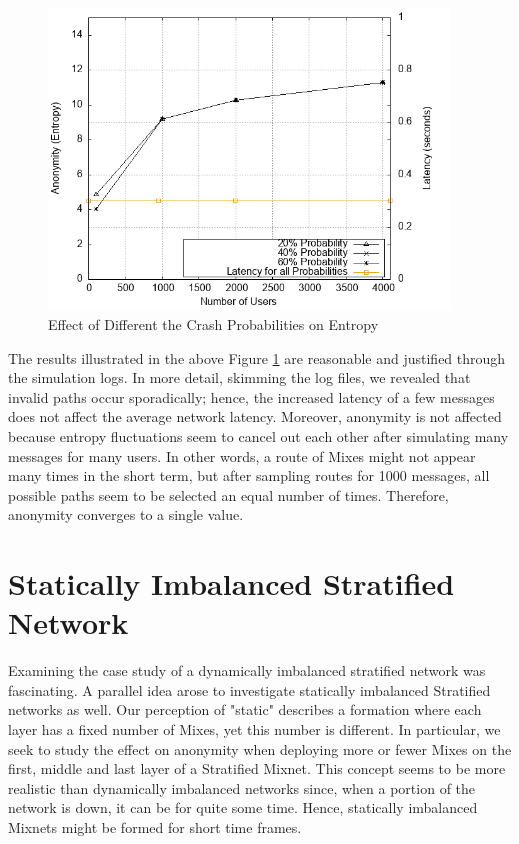 \documentclass[logo,msc,cyber]{infthesis}   %
\begin{document}
\begin{figure}[h!]
    \centering
    \includegraphics[height=8cm]{figures/simulator_extentions/mix_failure.png}
    \caption{Effect of Different the Crash Probabilities on Entropy}
    \label{fig:dynamic-crash-probability}
\end{figure}    


The results illustrated in the above Figure \ref{fig:dynamic-crash-probability}
are reasonable and justified through the simulation logs. In more detail,
skimming the log files, we revealed that invalid paths occur sporadically; hence,
the increased latency of a few messages does not affect the average network
latency. Moreover, anonymity is not affected because entropy fluctuations seem
to cancel out each other after simulating many messages for many users. In other
words, a route of Mixes might not appear many times in the short term, but after
sampling routes for 1000 messages, all possible paths seem to be selected an
equal number of times. Therefore, anonymity converges to a single value.

\section{Statically Imbalanced Stratified Network}

Examining the case study of a dynamically imbalanced stratified network was
fascinating. A parallel idea arose to investigate statically imbalanced
Stratified networks as well. Our perception of "static" describes a formation
where each layer has a fixed number of Mixes, yet this number is different. In
particular, we seek to study the effect on anonymity when deploying more or
fewer Mixes on the first, middle and last layer of a Stratified Mixnet. This
concept seems to be more realistic than dynamically imbalanced networks since,
when a portion of the network is down, it can be for quite some time. Hence,
statically imbalanced Mixnets might be formed for short time frames.
\end{document}
